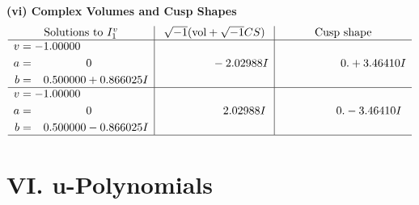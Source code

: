 \documentclass[1p]{elsarticle_modified}
\theoremstyle{definition}
\newcommand{\I}{\sqrt{-1}}
\begin{document}
\newpage\flushleft \textbf{(vi) Complex Volumes and Cusp Shapes}
$$\begin{array}{c|c|c}  
\text{Solutions to }I^v_{1}& \I (\text{vol} + \sqrt{-1}CS) & \text{Cusp shape}\\
 \hline 
\begin{aligned}
v &= -1.00000\phantom{ +0.000000I} \\
a &= \phantom{-0.000000 } 0 \\
b &= \phantom{-}0.500000 + 0.866025 I\end{aligned}
 & \phantom{-0.000000 } -2.02988 I & \phantom{-0.000000 -}0. + 3.46410 I \\ \hline\begin{aligned}
v &= -1.00000\phantom{ +0.000000I} \\
a &= \phantom{-0.000000 } 0 \\
b &= \phantom{-}0.500000 - 0.866025 I\end{aligned}
 & \phantom{-0.000000 -}2.02988 I & \phantom{-0.000000 } 0. - 3.46410 I\\
 \hline 
 \end{array}$$\newpage
\newpage\renewcommand{\arraystretch}{1}
\centering \section*{ VI. u-Polynomials}
\end{document}
